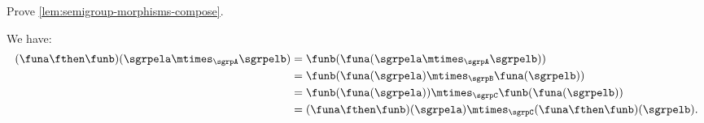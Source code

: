 \begin{exercise}
  Prove \cref{lem:semigroup-morphisms-compose}.
\end{exercise}
\begin{solution}
  We have:
  \begin{equation}
\begin{aligned}
  (\funa \fthen \funb)(\sgrpela \mtimes_{\sgrpA} \sgrpelb)&=\funb(\funa(\sgrpela \mtimes_{\sgrpA} \sgrpelb))\\
  &=\funb(\funa(\sgrpela)\mtimes_{\sgrpB}\funa(\sgrpelb))\\
  &=\funb(\funa(\sgrpela))\mtimes_{\sgrpC} \funb(\funa(\sgrpelb))\\
  &=(\funa \fthen \funb)(\sgrpela) \mtimes_{\sgrpC} (\funa \fthen \funb)(\sgrpelb).
\end{aligned}
\end{equation}
\end{solution}
\devel{
  \begin{forslides}
    \begin{equation}
      \label{eq:sgrp-posreals-mult}
      \tup{\posReals, \cdot}
    \end{equation}

    \begin{equation}
      \label{eq:sgrp-reals-plus}
      \tup{\reals, +}
    \end{equation}
  \end{forslides}
}%
